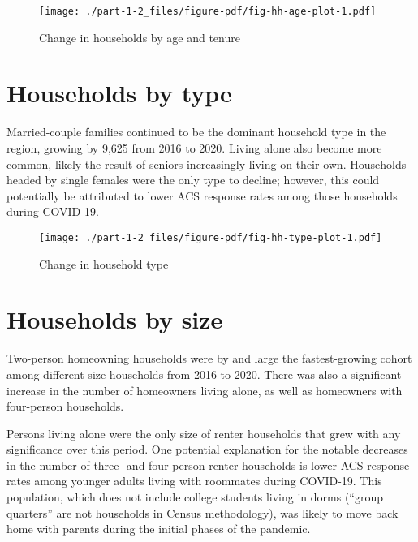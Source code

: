 \documentclass[
  letterpaper,
  DIV=11,
  numbers=noendperiod]{scrreprt}
\begin{document}
\begin{figure}

{\centering \texttt{[image: ./part-1-2\_files/figure-pdf/fig-hh-age-plot-1.pdf]}

}

\caption{\label{fig-hh-age-plot}Change in households by age and tenure}

\end{figure}

\hypertarget{households-by-type}{%
\section{Households by type}\label{households-by-type}}

Married-couple families continued to be the dominant household type in
the region, growing by 9,625 from 2016 to 2020. Living alone also become
more common, likely the result of seniors increasingly living on their
own. Households headed by single females were the only type to decline;
however, this could potentially be attributed to lower ACS response
rates among those households during COVID-19.

\begin{figure}

{\centering \texttt{[image: ./part-1-2\_files/figure-pdf/fig-hh-type-plot-1.pdf]}

}

\caption{\label{fig-hh-type-plot}Change in household type}

\end{figure}

\hypertarget{households-by-size}{%
\section{Households by size}\label{households-by-size}}

Two-person homeowning households were by and large the fastest-growing
cohort among different size households from 2016 to 2020. There was also
a significant increase in the number of homeowners living alone, as well
as homeowners with four-person households.

Persons living alone were the only size of renter households that grew
with any significance over this period. One potential explanation for
the notable decreases in the number of three- and four-person renter
households is lower ACS response rates among younger adults living with
roommates during COVID-19. This population, which does not include
college students living in dorms (``group quarters'' are not households
in Census methodology), was likely to move back home with parents during
the initial phases of the pandemic.
\end{document}
